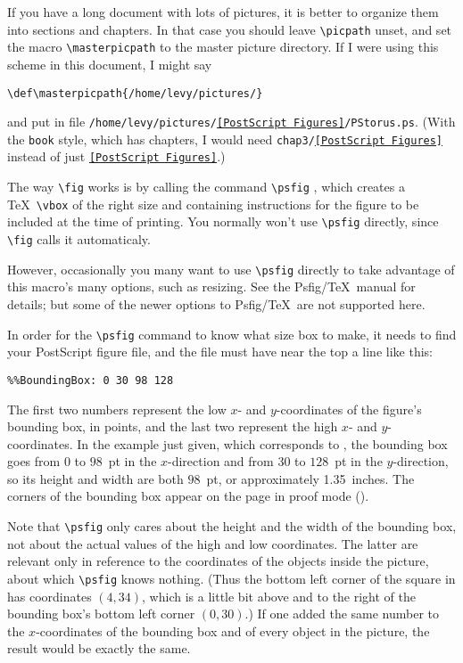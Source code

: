 If you have a long document with lots of pictures, it is better to
organize them into sections and chapters.  In that case you should
leave \verb+\picpath+ unset, and set the macro \verb+\masterpicpath+
to the master picture directory.  If I were using this scheme in this
document, I might say
%
\begin{verbatim}
\def\masterpicpath{/home/levy/pictures/}
\end{verbatim}
%
and put  in file
\verb+/home/levy/pictures/+{\tt\ref{PostScript Figures}}\verb+/PStorus.ps+.
(With the \verb+book+ style, which has chapters, I would need
\verb+chap3/+{\tt\ref{PostScript Figures}} 
instead of just {\tt\ref{PostScript Figures}}.)

The way \verb+\fig+ works is by calling
the command \verb+\psfig+ \cite{psfig}, which creates a \TeX\ \verb+\vbox+
of the right size and containing instructions for the figure to be
included at the time of printing.  You normally won't use 
\verb+\psfig+ directly, since \verb+\fig+ calls it automaticaly.

\begin{wizard}
However, occasionally you many want to use \verb|\psfig| directly to
take advantage of this macro's many options, such as resizing.  See
the Psfig/\TeX\ manual \cite{psfig} for details; but some of the newer
options to Psfig/\TeX\ are not supported here.
\end{wizard}

In order for the \verb+\psfig+ command to know what size box to make,
it needs to find your PostScript figure file, and
the file must have near the top a line like this:
\begin{verbatim}
%%BoundingBox: 0 30 98 128
\end{verbatim}
The first two numbers represent the low $x$- and $y$-coordinates of
the figure's bounding box, in points, and the last two represent
the high $x$- and $y$-coordinates.  In the example just given, which
corresponds to , the bounding box goes from $0$ to
$98$~pt in the $x$-direction and from $30$ to $128$~pt in the
$y$-direction, so its height and width are both $98$~pt, or
approximately 1.35~inches.  The corners of the bounding box appear on
the page in proof mode (). 

Note that \verb+\psfig+ only cares about the height and the width of
the bounding box, not about the actual values of the high and low
coordinates.  The latter are relevant only in reference to the
coordinates of the objects inside the picture, about which
\verb+\psfig+ knows nothing.  (Thus the bottom left corner of the
square in  has coordinates $(4,34)$, which is a
little bit above and to the right of the bounding box's bottom left
corner $(0,30)$.)  If one added the same number to the $x$-coordinates
of the bounding box and of every object in the picture, the result
would be exactly the same.

